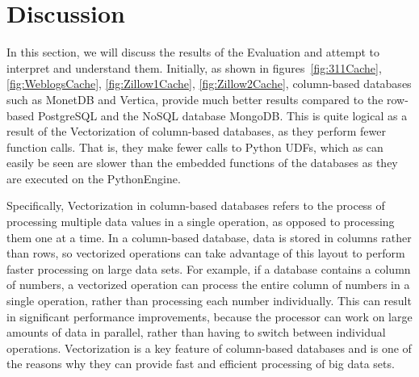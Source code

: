 \section{Discussion}
\label{sec:discussion}



In this section, we will discuss the results of the Evaluation and attempt to interpret and 
understand them. Initially, as shown in figures~\ref{fig:311Cache}, \ref{fig:WeblogsCache},
\ref{fig:Zillow1Cache}, \ref{fig:Zillow2Cache}, column-based databases such as MonetDB and 
Vertica, provide much better results compared to the row-based PostgreSQL and the NoSQL 
database MongoDB. This is quite logical as a result of the Vectorization of column-based 
databases, as they perform fewer function calls. That is, they make fewer calls to Python UDFs, 
which as can easily be seen are slower than the embedded functions of the databases as they 
are executed on the PythonEngine.

Specifically, Vectorization in column-based databases refers to the process of processing 
multiple data values in a single operation, as opposed to processing them one at a time. 
In a column-based database, data is stored in columns rather than rows, so vectorized 
operations can take advantage of this layout to perform faster processing on large data 
sets. For example, if a database contains a column of numbers, a vectorized operation 
can process the entire column of numbers in a single operation, rather than processing each 
number individually. This can result in significant performance improvements, because the 
processor can work on large amounts of data in parallel, rather than having to switch between 
individual operations. Vectorization is a key feature of column-based databases and is one of 
the reasons why they can provide fast and efficient processing of big data sets.


